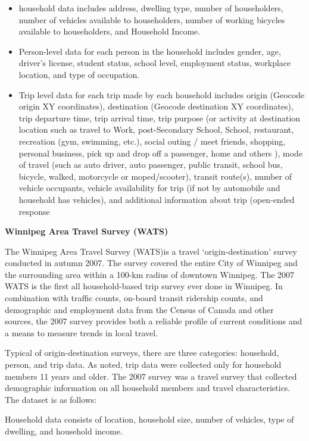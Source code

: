 \documentclass[
11pt, %
oneside, %
english, %
singlespacing, %
]{macthesis} %
\begin{document}
\begin{itemize}
\item
  household data includes address, dwelling type, number of householders, number of vehicles available to householders, number of working bicycles available to householders, and Household Income.
\item
  Person-level data for each person in the household includes gender, age, driver's license, student status, school level, employment status, workplace location, and type of occupation.
\item
  Trip level data for each trip made by each household includes origin (Geocode origin XY coordinates), destination (Geocode destination XY coordinates), trip departure time, trip arrival time, trip purpose (or activity at destination location such as travel to Work, post-Secondary School, School, restaurant, recreation (gym, swimming, etc.), social outing / meet friends, shopping, personal business, pick up and drop off a passenger, home and others ), mode of travel (such as auto driver, auto passenger, public transit, school bus, bicycle, walked, motorcycle or moped/scooter), transit route(s), number of vehicle occupants, vehicle availability for trip (if not by automobile and household has vehicles), and additional information about trip (open-ended response
\end{itemize}

\textbf{Winnipeg Area Travel Survey (WATS)}

The Winnipeg Area Travel Survey (WATS)is a travel `origin-destination' survey conducted in autumn 2007. The survey covered the entire City of Winnipeg and the surrounding area within a 100-km radius of downtown Winnipeg. The 2007 WATS is the first all household-based trip survey ever done in Winnipeg. In combination with traffic counts, on-board transit ridership counts, and demographic and employment data from the Census of Canada and other sources, the 2007 survey provides both a reliable profile of current conditions and a means to measure trends in local travel.

Typical of origin-destination surveys, there are three categories: household, person, and trip data. As noted, trip data were collected only for household members 11 years and older. The 2007 survey was a travel survey that collected demographic information on all household members and travel characteristics. The dataset is as follows:

Household data consists of location, household size, number of vehicles, type of dwelling, and household income.
\end{document}
